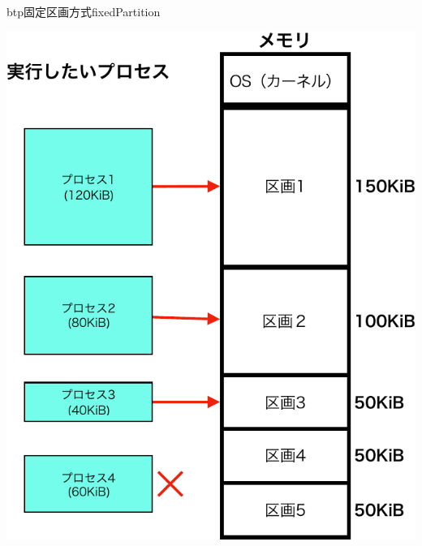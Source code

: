 \begin{myfig}{btp}{固定区画方式}{fixedPartition}
  \begin{minipage}{0.49\columnwidth}
    \begin{center}
      \includegraphics[scale=0.6]{Fig/fixedPartitionLoad-crop.pdf}
      \label{fig:fixedPartitionA}
    \end{center}
  \end{minipage}
  \begin{minipage}{0.49\columnwidth}
    \begin{center}

\end{center}
\end{minipage}
\end{myfig}
